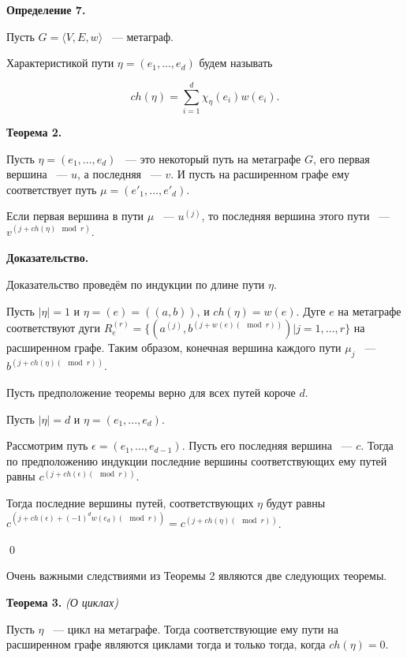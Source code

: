 \documentclass[14pt]{mmcs-article}
\begin{document}

\textbf{Определение 7.}

Пусть $G = \langle V, E, w \rangle$ ~--- метаграф.

Характеристикой пути $\eta = (e_1, ..., e_d)$ будем называть


\[
    ch(\eta) = \sum_{i = 1}^d \chi_{\eta}(e_i) w(e_i).
\]

\textbf{Теорема 2.}

Пусть  $\eta = (e_1, ..., e_d)$ ~--- это некоторый путь на метаграфе $G$, его первая вершина ~--- $u$, а последняя ~--- $v$. И пусть на расширенном графе ему соответствует путь $\mu = (e'_1, ..., e'_d)$.

Если первая вершина в пути $\mu$ ~--- $u^{(j)}$, то последняя вершина этого пути ~--- $v^{(j + ch(\eta)\mod{r})}$.

\textbf{Доказательство.}


Доказательство проведём по индукции по длине пути $\eta$.

Пусть $|\eta| = 1$ и  $\eta = (e) = ((a,b))$, и $ch(\eta) = w(e)$. Дуге $e$ на метаграфе соответствуют дуги $R^{(r)}_e = \{ (a^{(j)}, b^{(j + w(e) (\mod{r}))} ) | j = 1, ..., r \}$
на расширенном графе. Таким образом, конечная вершина каждого пути $\mu_j$ ~--- $b^{(j + ch(\eta) (\mod{r}))}$.

Пусть предположение теоремы верно для всех путей короче $d$.

Пусть $|\eta| = d$ и $\eta = (e_1, ..., e_d)$.

Рассмотрим путь $\epsilon = (e_1, ..., e_{d-1})$. Пусть его последняя вершина ~--- $c$. Тогда по предположению индукции последние вершины соответствующих ему путей равны $c^{(j + ch(\epsilon) (\mod{r}))}$.

Тогда последние вершины путей, соответствующих $\eta$ будут равны $c^{(j + ch(\epsilon) + (-1)^d w(e_d) (\mod{r}))} = c^{(j + ch(\eta) (\mod{r}))}$.

\qed

Очень важными следствиями из Теоремы 2 являются две следующих теоремы.

\textbf{Теорема 3.} \textsl{(О циклах)}

Пусть $\eta$ ~--- цикл на метаграфе. Тогда соответствующие ему пути на расширенном графе являются циклами тогда и только тогда, когда $ch(\eta) = 0$.
\end{document}
